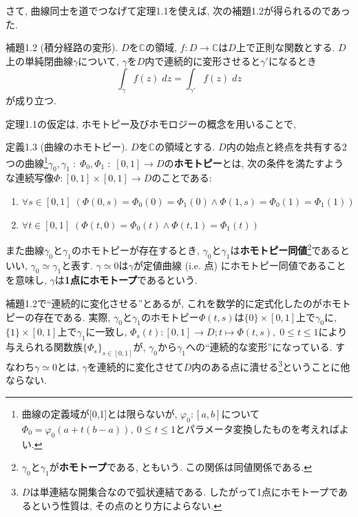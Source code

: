\documentclass{jsarticle}
\newcommand{\C}{\mathbb{C}}%
\begin{document}
さて, 曲線同士を道でつなげて定理1.1を使えば, 次の補題1.2が得られるのであった.
\begin{lem}{補題1.2 (積分経路の変形).}
$D$を$\C$の領域, $f\colon D\to \C$は$D$上で正則な関数とする. $D$上の単純閉曲線$\gamma$について, $\gamma$を$D$内で連続的に変形させると$\gamma'$になるとき
\[
\int_{\gamma}f(z)\;dz = \int_{\gamma'}f(z)\;dz
\]
が成り立つ.
\end{lem}
\vspace{1em}

定理1.1の仮定は,  ホモトピー及びホモロジーの概念を用いることで, 

\begin{Def}{定義1.3 (曲線のホモトピー).}
$D$を$\C$の領域とする. $D$内の始点と終点を共有する2つの曲線\footnote{曲線の定義域が[0,1]とは限らないが, $\varphi_0\colon[a, b]$について$\Phi_0 = \varphi_0(a+t(b-a)),\:0\le t \le1$とパラメータ変換したものを考えればよい.}$\gamma_0, \gamma_1\;\colon \;\Phi_0, \Phi_1\;\colon\; [0,1] \to D$の\textbf{ホモトピー}とは, 次の条件を満たすような連続写像$\Phi\colon[0,1]\times[0,1]\to D$のことである$\colon$
\begin{enumerate}
\item[(i)] $\forall s\in[0, 1]\;\left(\Phi(0, s) = \Phi_0(0) = \Phi_1(0) \land \Phi(1, s) = \Phi_0(1) = \Phi_1(1)\right)$
\item[(ii)]$\forall t\in[0,1]\;\left(\Phi(t, 0) = \Phi_0(t) \land \Phi(t, 1) = \Phi_1(t)\right)$
\end{enumerate}
また曲線$\gamma_0$と$\gamma_1$のホモトピーが存在するとき, $\gamma_0$と$\gamma_1$は\textbf{ホモトピー同値}\footnote{$\gamma_0$と$\gamma_1$が\textbf{ホモトープ}である, ともいう. この関係は同値関係である.}であるといい, $\gamma_0 \simeq \gamma_1$と表す. $\gamma\simeq 0$は$\gamma$が定値曲線 (i.e. 点) にホモトピー同値であることを意味し, $\gamma$は\textbf{1点にホモトープ}であるという.
\end{Def}

補題1.2で``連続的に変化させる''とあるが, これを数学的に定式化したのがホモトピーの存在である. 実際, $\gamma_0$と$\gamma_1$のホモトピー$\Phi(t, s)$は$\{0\}\times[0, 1]$上で$\gamma_0$に, $\{1\}\times[0, 1]$上で$\gamma_1$に一致し, $\Phi_{s}(t)\colon[0, 1]\to D; t\mapsto \Phi(t, s),\;0\le t\le1$により与えられる関数族$\{\Phi_s\}_{s\in[0, 1]}$が, $\gamma_0$から$\gamma_1$への``連続的な変形''になっている. すなわち$\gamma\simeq 0$とは, $\gamma$を連続的に変化させて$D$内のある点に潰せる\footnote{$D$は単連結な開集合なので弧状連結である. したがって1点にホモトープであるという性質は, その点のとり方によらない.}ということに他ならない.
\end{document}
